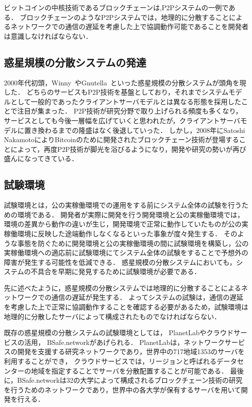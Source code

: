ビットコインの中核技術であるブロックチェーンは,P2Pシステムの一例である．
ブロックチェーンのようなP2Pシステムでは，地理的に分散することによるネットワークでの通信の遅延を考慮した上で協調動作可能であることを開発者は意識しなければならない．

\subsection{惑星規模の分散システムの発達}

2000年代初頭，Winny~\cite{Winny}やGnutella~\cite{Gnutella}といった惑星規模の分散システムが頭角を現した．
どちらのサービスもP2P技術を基盤としており，それまでシステムモデルとして一般的であったクライアントサーバモデルとは異なる形態を採用したことで注目が集まった．
P2P技術が研究分野で取り上げられる頻度も多くなり，サービスとしても今後一層幅を広げていくと思われたが，クライアントサーバモデルに置き換わるまでの隆盛はなく後退していった．
しかし，2008年にSatoshi NakamotoによりBitcoinのために開発されたブロックチェーン技術が登場することによって，再度P2P技術が脚光を浴びるようになり，開発や研究の勢いが再び盛んになってきている．

\subsection{試験環境}

試験環境とは，公の実稼働環境での運用をする前にシステム全体の試験を行うための環境である．
開発者が実際に開発を行う開発環境と公の実稼働環境では，環境の差異から動作の違いが生じ，開発環境で正常に動作していたものが公の実稼働環境に反映した途端動作しなくなるといった事象が度々発生する．
そのような事態を防ぐために開発環境と公の実稼働環境の間に試験環境を構築し，公の実稼働環境への適応前に試験環境にてシステム全体の試験をすることで予想外の障害が発生する可能性を低減できる．
惑星規模の分散システムにおいても，システムの不具合を早期に発見するために試験環境が必要である．

先に述べたように，惑星規模の分散システムでは地理的に分散することによるネットワークでの通信の遅延が発生する．
よってシステムの試験は，通信の遅延を考慮した上で正常に協調動作することを確認する必要があるため，試験環境は地理的に分散したサーバによって構成されたものでなければならない．

既存の惑星規模の分散システムの試験環境としては， PlanetLabやクラウドサービスの活用， BSafe.networkがあげられる．
PlanetLabは，ネットワークサービスの開発を支援する研究ネットワークであり，世界中の717地域1353のサーバを利用することができ，
クラウドサービスでは，リージョンと呼ばれるデータセンターの地域を指定することでサーバを分散配置することが可能である．
最後に，BSafe.networkは32の大学によって構成されるブロックチェーン技術の研究を行うためのネットワークであり，世界中の各大学が保有するサーバを用いて開発を行える．

